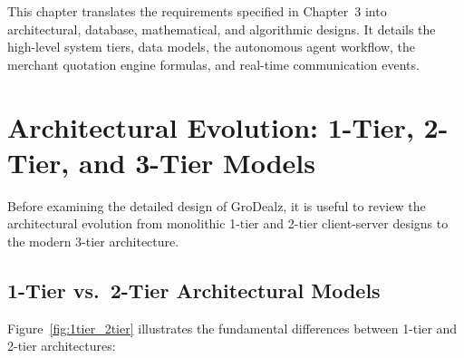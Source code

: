 
This chapter translates the requirements specified in Chapter~3 into architectural, database, mathematical, and algorithmic designs. It details the high-level system tiers, data models, the autonomous agent workflow, the merchant quotation engine formulas, and real-time communication events.

\section{Architectural Evolution: 1-Tier, 2-Tier, and 3-Tier Models}

Before examining the detailed design of GroDealz, it is useful to review the architectural evolution from monolithic 1-tier and 2-tier client-server designs to the modern 3-tier architecture.

\subsection{1-Tier vs.\ 2-Tier Architectural Models}

Figure~\ref{fig:1tier_2tier} illustrates the fundamental differences between 1-tier and 2-tier architectures:

